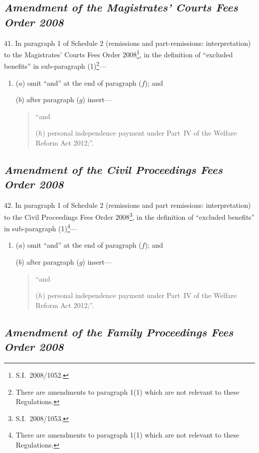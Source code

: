 \documentclass[12pt,a4paper]{article}
\begin{document}
\subsection*{\itshape\sloppy Amendment of the Magistrates’ Courts Fees Order 2008}

41.  In paragraph 1 of Schedule 2 (remissions and part-remissions: interpretation) to the Magistrates’ Courts Fees Order 2008\footnote{S.I.~2008/1052.}, in the definition of “excluded benefits” in sub-paragraph (1)\footnote{There are amendments to paragraph 1(1) which are not relevant to these Regulations.}—
\begin{enumerate}\item[]
($a$) omit “and” at the end of paragraph ($f$); and

($b$) after paragraph ($g$)  insert—
\begin{quotation}
“and

($h$) personal independence payment under Part~IV of the Welfare Reform Act 2012;”.
\end{quotation}
\end{enumerate}

\subsection*{\itshape Amendment of the Civil Proceedings Fees Order 2008}

42.  In paragraph 1 of Schedule 2 (remissions and part remissions: interpretation) to the Civil Proceedings Fees Order 2008\footnote{S.I.~2008/1053.}, in the definition of “excluded benefits” in sub-paragraph (1)\footnote{There are amendments to paragraph 1(1) which are not relevant to these Regulations.}—
\begin{enumerate}\item[]
($a$) omit “and” at the end of paragraph ($f$); and

($b$) after paragraph ($g$)  insert—
\begin{quotation}
“and

($h$) personal independence payment under Part~IV of the Welfare Reform Act 2012;”.
\end{quotation}
\end{enumerate}

\subsection*{\itshape\sloppy Amendment of the Family Proceedings Fees Order 2008}
\end{document}

